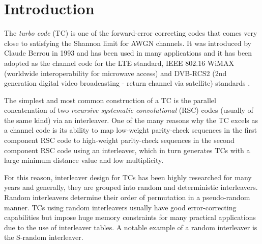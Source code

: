 \section{Introduction}

The {\it turbo code} (TC) \cite{ref1} is one of the forward-error correcting codes that comes very close to satisfying the Shannon limit for AWGN channels. It was introduced by Claude Berrou in 1993 and has been used in many applications and it has been adopted as the channel code for the LTE standard, IEEE 802.16 WiMAX (worldwide interoperability for microwave access) and DVB-RCS2 (2nd generation digital video broadcasting - return channel via satellite) standards \cite{ref7}.

 The simplest and most common construction of a TC is the parallel concatenation of two {\it recursive systematic convolutional} (RSC) codes (usually of the same kind) via an interleaver. One of the many reasons why the TC excels as a channel code is its ability to map low-weight parity-check sequences in the first component RSC code to high-weight parity-check sequences in the second component RSC code using an interleaver, which in turn generates TCs with a large minimum distance value and low multiplicity.

 For this reason, interleaver design for TCs has been highly researched for many years and generally, they are grouped into random and deterministic interleavers. Random interleavers determine their order of permutation in a pseudo-random manner. TCs using random interleavers usually have good error-correcting capabilities but impose huge memory constraints for many practical applications due to the use of interleaver tables. A notable example of a random interleaver is the S-random interleaver.

